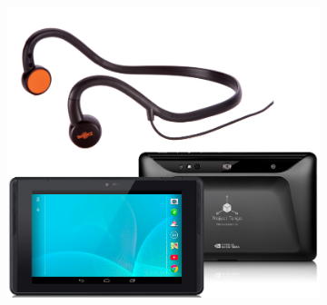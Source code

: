 \documentclass[sigconf, screen=true, anonymous=true]{acmart}
\begin{document}
\begin{figure}
  \centering
  \begin{subfigure}[t]{0.5\columnwidth}
    \includegraphics[width=1.0\columnwidth]{figures/tango_headphone.png}
    \caption{}\label{fig:tango-headphone}
  \end{subfigure}%
  ~
  \begin{subfigure}[t]{0.5\columnwidth}
    \centering

\end{subfigure}
\end{figure}
\end{document}
